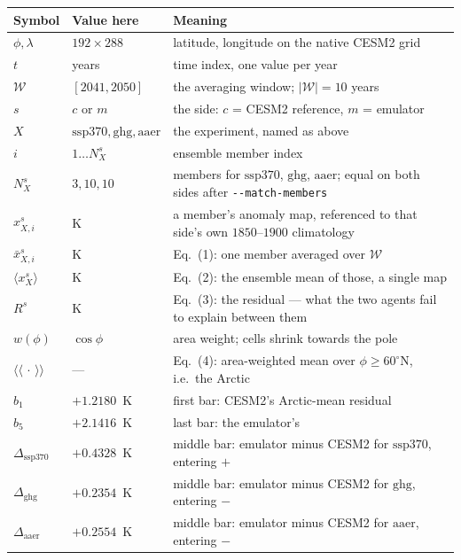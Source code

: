 \documentclass[11pt]{article}
\newcommand{\Xssp}{\mathrm{ssp370}}
\newcommand{\Xghg}{\mathrm{ghg}}
\newcommand{\Xaer}{\mathrm{aaer}}
\newcommand{\ameanN}[1]{\bigl\langle\!\bigl\langle #1 \bigr\rangle\!\bigr\rangle}
\begin{document}
\begin{center}
\small
\renewcommand{\arraystretch}{1.12}
\begin{tabular}{@{}l l p{8.6cm}@{}}
\toprule
Symbol & Value here & Meaning \\
\midrule
$\phi,\lambda$ & $192\times288$ & latitude, longitude on the native CESM2 grid \\
$t$ & years & time index, one value per year \\
$\mathcal{W}$ & $[2041,2050]$ & the averaging window; $|\mathcal{W}|=10$ years \\
\addlinespace
$s$ & $c$ or $m$ & the side: $c$ = CESM2 reference, $m$ = emulator \\
$X$ & $\Xssp,\Xghg,\Xaer$ & the experiment, named as above \\
\addlinespace
$i$ & $1\dots N^{s}_{X}$ & ensemble member index \\
$N^{s}_{X}$ & $3,10,10$ & members for $\Xssp$, $\Xghg$, $\Xaer$; equal on both
   sides after \texttt{-{}-match-members} \\
$x^{s}_{X,i}$ & K & a member's anomaly map, referenced to that side's own
   $1850$--$1900$ climatology \\
\addlinespace
$\bar{x}^{s}_{X,i}$ & K & Eq.~(1): one member averaged over $\mathcal{W}$ \\
$\langle x^{s}_{X}\rangle$ & K & Eq.~(2): the ensemble mean of those, a single map \\
$R^{s}$ & K & Eq.~(3): the residual --- what the two agents fail to explain
   between them \\
\addlinespace
$w(\phi)$ & $\cos\phi$ & area weight; cells shrink towards the pole \\
$\ameanN{\,\cdot\,}$ & --- & Eq.~(4): area-weighted mean over
   $\phi\geq60^{\circ}\mathrm{N}$, i.e.\ the Arctic \\
\addlinespace
$b_{1}$ & $+1.2180$~K & first bar: CESM2's Arctic-mean residual \\
$b_{5}$ & $+2.1416$~K & last bar: the emulator's \\
$\Delta_{\Xssp}$ & $+0.4328$~K & middle bar: emulator minus CESM2 for $\Xssp$,
   entering $+$ \\
$\Delta_{\Xghg}$ & $+0.2354$~K & middle bar: emulator minus CESM2 for $\Xghg$,
   entering $-$ \\
$\Delta_{\Xaer}$ & $+0.2554$~K & middle bar: emulator minus CESM2 for $\Xaer$,
   entering $-$ \\
\bottomrule
\end{tabular}
\end{center}
\end{document}
